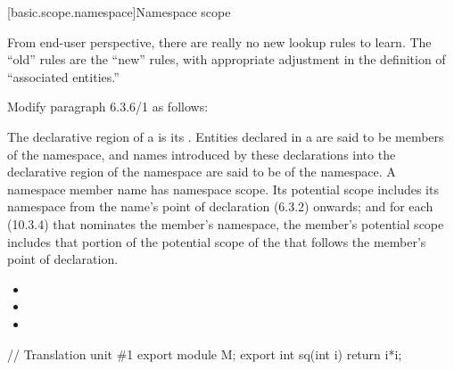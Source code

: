 \setcounter{subsection}{5}
[basic.scope.namespace]{Namespace scope}

From end-user perspective, there are really no new lookup rules to
learn.  The ``old'' rules are the ``new'' rules, with appropriate
adjustment in the definition of ``associated entities.''

\noindent
Modify paragraph 6.3.6/1 as follows:
\begin{std.txt}
  \resetalinea[0]
  \alinea
  The declarative region of a  is its
  . 
  Entities declared in a 
  are said to be members of the namespace, and names introduced by
  these declarations 
  into the declarative region of the namespace are said to be
   of the namespace. A namespace member name
  has namespace
  scope. Its potential scope includes its namespace from the name's
  point of declaration (6.3.2) onwards;
   and for each 
  (10.3.4) that nominates the member's namespace, the member's
  potential scope includes that portion of the potential scope of the
   that follows the member's point of
  declaration.
\begin{before}
\end{before}
\begin{after}
 \color{addclr}
\begin{itemize}
\item {}
\item {}
\item {}
\end{itemize}
\end{after}
  \color{addclr}
   \enterexample
   \begin{codeblock}
    // Translation unit \#1
    export module M;
    export int sq(int i) { return i*i; }


\end{codeblock}
\end{std.txt}
